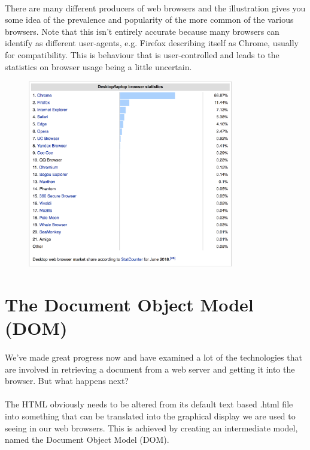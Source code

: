 \documentclass[12pt, a4paper, oneside]{book}
\begin{document}
\paragraph{} There are many different producers of web browsers and the illustration gives you some idea of the prevalence and popularity of the more common of the various browsers. Note that this isn't entirely accurate because many browsers can identify as different user-agents, e.g. Firefox describing itself as Chrome, usually for compatibility. This is behaviour that is user-controlled and leads to the statistics on browser usage being a little uncertain.


\begin{figure}[H]
\centering
\includegraphics[width=0.8\textwidth]{figures/browser-stats.png}
\label{fig:browser-stats}
\end{figure}


\section{The Document Object Model (DOM)}
\paragraph{} We've made great progress now and have examined a lot of the technologies that are involved in retrieving a document from a web server and getting it into the browser. But what happens next?
\paragraph{} The HTML obviously needs to be altered from its default text based .html file into something that can be translated into the graphical display we are used to seeing in our web browsers. This is achieved by creating an intermediate model, named the Document Object Model (DOM).
\end{document}
